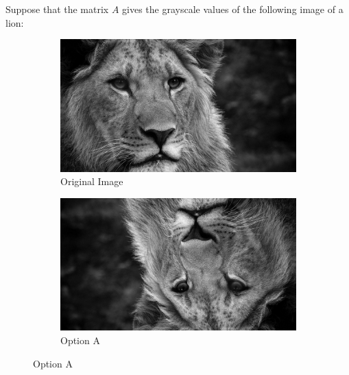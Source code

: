 \documentclass{ximera}
\author{Zack Reed}
\begin{document}
\begin{problem}

  
  Suppose that the matrix $A$ gives the grayscale values of the following image of a lion:
  
  \begin{figure}[h]
    \centering
    \begin{subfigure}[b]{0.45\textwidth}
      \centering
      \includegraphics[width=\textwidth]{test_image.jpg}
      \caption{Original Image}
      \label{fig:original}
    \end{subfigure}
    \hfill
    \begin{subfigure}[b]{0.45\textwidth}
      \centering
      \includegraphics[width=\textwidth]{test_image_rot_2.jpg}
      \caption{Option A}
      \label{fig:optionA}
    \end{subfigure}
  \end{figure}
  

\end{problem}
\end{document}
